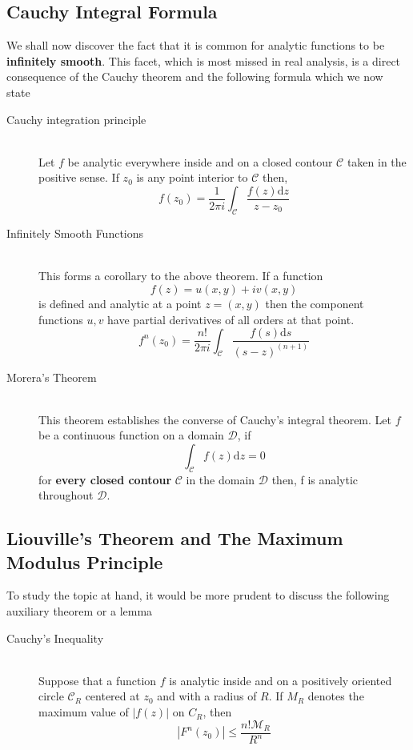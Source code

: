 \documentclass[11pt]{article}
\begin{document}
\begin{sloppypar}
\subsection{Cauchy Integral Formula}
We shall now discover the fact that it is common for analytic functions to be \textbf{infinitely smooth}. This facet, which is most missed in real analysis, is a direct consequence of the Cauchy theorem and the following formula which we now state
\begin{description}
\item[Cauchy integration principle] \hfill \\
	Let $f$ be analytic everywhere inside and on a closed contour $\mathcal{C}$ taken in the positive sense. If $z_{0}$ is any point interior to $\mathcal{C}$ then,
	$$f(z_{0}) = \frac{1}{2\pi i}\int_\mathcal{C} \frac{f(z) \mathrm{d}z}{z - z_{0}}$$
\item[Infinitely Smooth Functions] \hfill \\
	This forms a corollary to the above theorem. If a function $$f(z) = u(x,y)+iv(x,y)$$ is defined and analytic at a point $z = (x,y)$ then the component functions $u,v$ have partial derivatives of all orders at that point.
	$$f^n(z_{0}) = \frac{n!}{2\pi i} \int_\mathcal{C} \frac{f(s) \mathrm{d}s}{(s-z)^(n+1)}$$
\item[Morera\rq{}s Theorem] \hfill \\
	This theorem establishes the converse of Cauchy\rq{}s integral theorem. Let $f$ be a continuous function on a domain $\mathcal{D}$, if $$\int_\mathcal{C} f(z)\mathrm{d}z = 0$$ for \textbf{every closed contour} $\mathcal{C}$ in the domain $\mathcal{D}$ then, f is analytic throughout $\mathcal{D}$.
\end{description}

\subsection{Liouville\rq{}s Theorem and The Maximum Modulus Principle}
To study the topic at hand, it would be more prudent to discuss the following auxiliary theorem or a lemma
\begin{description}
\item[Cauchy\rq{}s Inequality] \hfill \\
Suppose that a function $f$ is analytic inside and on a positively oriented circle $\mathcal{C}_{R}$ centered at $z_{0}$ and with a radius of $R$. If $M_{R}$ denotes the maximum value of $|f(z)|$ on $C_{R}$, then
$$|F^n(z_{0})| \leq \frac{n!\mathcal{M}_{R}}{R^n}$$\


\end{description}
\end{sloppypar}
\end{document}
